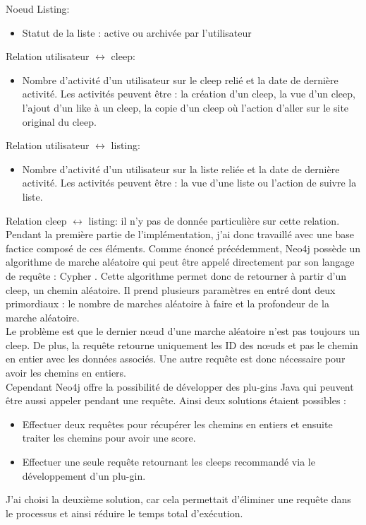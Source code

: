 \documentclass{article} %
\begin{document}
Noeud Listing:
\begin{itemize}
	\item Statut de la liste : active ou archivée par l'utilisateur
	
\end{itemize}
Relation utilisateur $\leftrightarrow$ cleep:
\begin{itemize}
	\item Nombre d'activité d'un utilisateur sur le cleep relié et la date de dernière activité. Les activités peuvent être : la création d'un cleep, la vue d'un cleep, l'ajout d'un like à un cleep, la copie d'un cleep où l'action d'aller sur le site original du cleep.
\end{itemize}

Relation utilisateur $\leftrightarrow$ listing:
\begin{itemize}
	\item Nombre d'activité d'un utilisateur sur la liste reliée et la date de dernière activité. Les activités peuvent être : la vue d'une liste ou l'action de suivre la liste.	
\end{itemize}

Relation cleep $\leftrightarrow$ listing: il n'y pas de donnée particulière sur cette relation.\\

Pendant la première partie de l'implémentation, j'ai donc travaillé avec une base factice composé de ces éléments. Comme énoncé précédemment, Neo4j possède un algorithme de marche aléatoire qui peut être appelé directement par son langage de requête : Cypher \cite{cypher}. Cette algorithme permet donc de retourner à partir d'un cleep, un chemin aléatoire. Il prend plusieurs paramètres en entré dont deux primordiaux : le nombre de marches aléatoire à faire et la profondeur de la marche aléatoire.\\
Le problème est que le dernier nœud d'une marche aléatoire n'est pas toujours un cleep. De plus, la requête retourne uniquement les ID des nœuds et pas le chemin en entier avec les données associés. Une autre requête est donc nécessaire pour avoir les chemins en entiers.\\
Cependant Neo4j offre la possibilité de développer des plu-gins Java qui peuvent être aussi appeler pendant une requête. Ainsi deux solutions étaient possibles :
\begin{itemize}
	\item Effectuer deux requêtes pour récupérer les chemins en entiers et ensuite traiter les chemins pour avoir une score.
	\item Effectuer une seule requête retournant les cleeps recommandé via le développement d'un plu-gin.
\end{itemize}
J'ai choisi la deuxième solution, car cela permettait d'éliminer une requête dans le processus et ainsi réduire le temps total d'exécution. 
\newpage
\end{document}
